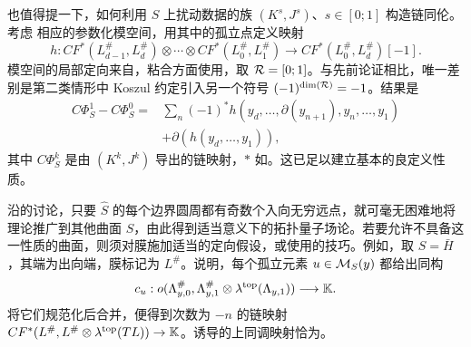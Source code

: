 也值得提一下，如何利用 $S$ 上扰动数据的族 $(K^s,\allowbreak J^s)$、$s\in[0;1]$ 构造链同伦。考虑
相应的参数化模空间，用其中的孤立点定义映射
\[
h:CF^*(L_{d-1}^\#,L_d^\#)\otimes\cdots\otimes CF^*(L_0^\#,L_1^\#)\longrightarrow CF^*(L_0^\#,L_d^\#)[-1].
\]
模空间的局部定向来自，粘合方面使用，取 $\mathcal R=[0;1]$。与先前论证相比，唯一差别是第二类情形中 Koszul 约定引入另一个符号 $(-1)^{\dim(\mathcal R)}=-1$。结果是
\begin{equation}\label{eq:12.20}
\begin{aligned}
C\Phi_S^1-C\Phi_S^0={}&\sum_n(-1)^*h(y_d,\ldots,\partial(y_{n+1}),y_n,\ldots,y_1)\\
&+\partial(h(y_d,\ldots,y_1)),
\end{aligned}
\end{equation}
其中 $C\Phi_S^k$ 是由 $(K^k,\allowbreak J^k)$ 导出的链映射，$*$ 如。这已足以建立基本的良定义性质。

沿的讨论，只要 $\hat S$ 的每个边界圆周都有奇数个入向无穷远点，就可毫无困难地将理论推广到其他曲面 $S$，由此得到适当意义下的拓扑量子场论。若要允许不具备这一性质的曲面，则须对膜施加适当的定向假设，或使用的技巧。例如，取 $S=\bar H$，其端为出向端，膜标记为 $L^\#$。说明，每个孤立元素 $u\in\mathcal M_S(y)$ 都给出同构
\[
c_u:o(\Lambda_{y,0}^\#,\Lambda_{y,1}^\#\otimes\lambda^{\mathrm{top}}(\Lambda_{y,1}))\longrightarrow\mathbb K.
\]
将它们规范化后合并，便得到次数为 $-n$ 的链映射 $CF^*(L^\#,\allowbreak L^\#\otimes\lambda^{\mathrm{top}}(TL))\to\mathbb K$。诱导的上同调映射恰为。

